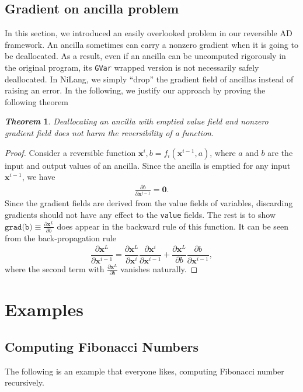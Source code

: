 \documentclass[aps,twocolumn,longbibliography,english,superscriptaddress]{revtex4-1}
\newcommand{\<}{\langle}
\renewcommand{\>}{\rangle}
\newcommand{\vx}{{\mathbf{x}}}
\newtheorem{theorem}{\textit{Theorem}}
\theoremstyle{definition}\newtheorem{definition}{\textit{Definition}}
\begin{document}
\subsection{Gradient on ancilla problem}
In this section, we introduced an easily overlooked problem in our reversible AD framework.
An ancilla sometimes can carry a nonzero gradient when it is going to be deallocated. As a result, even if an ancilla can be uncomputed rigorously in the original program, its \texttt{GVar} wrapped version is not necessarily safely deallocated.
In NiLang, we simply ``drop'' the gradient field of ancillas instead of raising an error.
In the following, we justify our approach by proving the following theorem
\begin{theorem}
    Deallocating an ancilla with emptied value field and nonzero gradient field does not harm the reversibility of a function.
\end{theorem}
\begin{proof}
    Consider a reversible function $\vx^i, b = f_i(\vx^{i-1}, a)$, where $a$ and $b$ are the input and output values of an ancilla. Since the ancilla is emptied for any input $\vx^{i-1}$, we have
\begin{align}
    \frac{\partial b}{\partial \vx^{i-1}} = \mathbf{0}.
\end{align}
Since the gradient fields are derived from the value fields of variables, discarding gradients should not have any effect to the \texttt{value} fields.
    The rest is to show $\texttt{grad(b)} \equiv \frac{\partial \vx^L}{\partial{b}}$ does appear in the backward rule of this function. It can be seen from the back-propagation rule 
\begin{equation}
    \frac{\partial \vx^L}{\partial \vx^{i-1}} = \frac{\partial \vx^L}{\partial \vx^i}\frac{\partial \vx^i}{\partial \vx^{i-1}} + \frac{\partial \vx^L}{\partial b}\frac{\partial b}{\partial \vx^{i-1}},
\end{equation}
where the second term with $\frac{\partial \vx^L}{\partial{b}}$ vanishes naturally.
\end{proof}

\section{Examples}\label{sec:example}

\subsection{Computing Fibonacci Numbers}\label{sec:fib}
The following is an example that everyone likes, computing Fibonacci number recursively.
\end{document}
